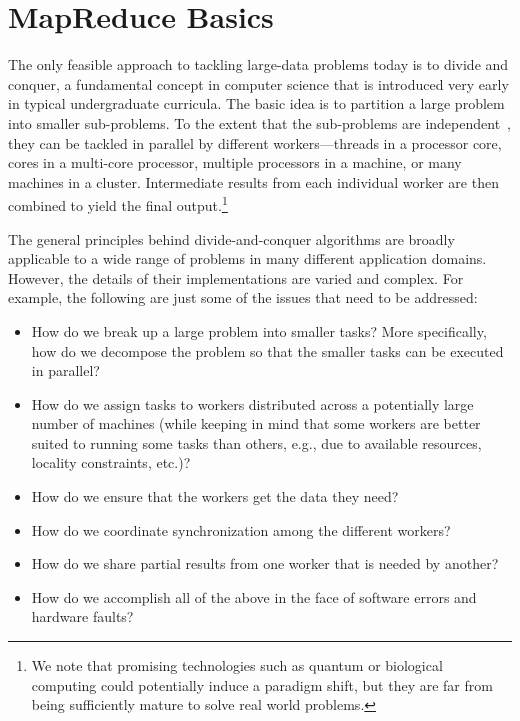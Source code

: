 \chapter{MapReduce Basics}
\label{chapter2}

The only feasible approach to tackling large-data problems today is to
divide and conquer, a fundamental concept in computer science that is
introduced very early in typical undergraduate curricula.  The basic
idea is to partition a large problem into smaller sub-problems.  To
the extent that the sub-problems are independent~\cite{Amdahl_1967},
they can be tackled in parallel by different workers---threads in a
processor core, cores in a multi-core processor, multiple processors
in a machine, or many machines in a cluster.  Intermediate results
from each individual worker are then combined to yield the final
output.\footnote{We note that promising technologies such as quantum
or biological computing could potentially induce a paradigm shift, but
they are far from being sufficiently mature to solve real world
problems.}

The general principles behind divide-and-conquer algorithms are
broadly applicable to a wide range of problems in many different
application domains.  However, the details of their implementations
are varied and complex.  For example, the following are just some of
the issues that need to be addressed:

\begin{itemize}

\item How do we break up a large problem into smaller tasks?  
  More specifically, how do we decompose the problem so that the
  smaller tasks can be executed in parallel?

\item How do we assign tasks to workers distributed across a
  potentially large number of machines (while keeping in mind that
  some workers are better suited to running some tasks than others,
  e.g., due to available resources, locality constraints, etc.)?

\item How do we ensure that the workers get the data they need?

\item How do we coordinate synchronization among the different
  workers?

\item How do we share partial results from one worker that is needed
  by another?

\item How do we accomplish all of the above in the face of software
  errors and hardware faults?

\end{itemize}

